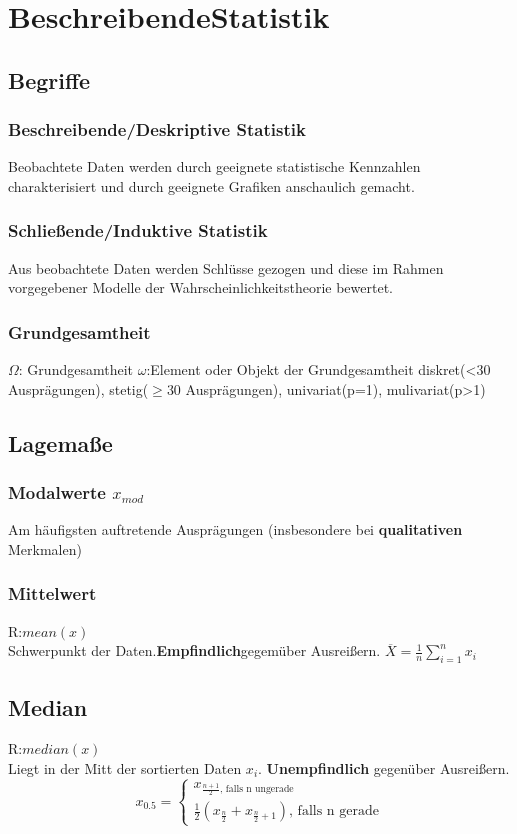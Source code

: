 \section{BeschreibendeStatistik}
  \subsection{Begriffe}
    \subsubsection{Beschreibende/Deskriptive Statistik}
    Beobachtete Daten werden durch geeignete statistische Kennzahlen charakterisiert und durch geeignete Grafiken anschaulich gemacht.
    \subsubsection{Schließende/Induktive Statistik}
    Aus beobachtete Daten werden Schlüsse gezogen und diese im Rahmen vorgegebener Modelle der Wahrscheinlichkeitstheorie bewertet.
    \subsubsection{Grundgesamtheit}
    $\Omega$: Grundgesamtheit
    $\omega$:Element oder Objekt der Grundgesamtheit
    diskret(<30 Ausprägungen), stetig($\geq$30 Ausprägungen), univariat(p=1), mulivariat(p>1)
  \subsection{Lagemaße}
    \subsubsection{Modalwerte $x_{mod}$}
    Am häufigsten auftretende Ausprägungen (insbesondere bei \textbf{qualitativen} Merkmalen)
    \subsubsection{Mittelwert}
    R:$mean(x)$\\
    Schwerpunkt der Daten.\textbf{Empfindlich}gegemüber Ausreißern.
    $\overline{X} = \frac{1}{n} \sum_{i=1}^{n} x_{i}$
    \subsection{Median}
    R:$median(x)$\\
    Liegt in der Mitt der sortierten Daten $x_{i}$. \textbf{Unempfindlich} gegenüber Ausreißern.
    \begin{equation}
      x_{0.5} =
        \begin{cases}
        	x_{\frac{n+1}{2} \text{, falls n ungerade}}\\
        	\frac{1}{2}(x_{\frac{n}{2}} + x_{\frac{n}{2}+1}) \text{, falls n gerade}
        \end{cases}
    \end{equation}
